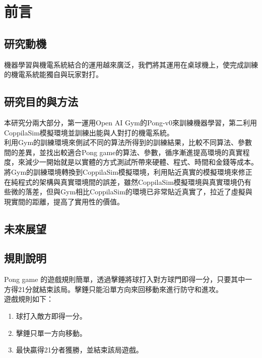 \documentclass[14pt,a4paper]{report}  %
\begin{document}
\chapter{前言}
\renewcommand{\baselinestretch}{10.0} %
\setcounter{page}{1}  %
\fontsize{14pt}{2.5pt}\sectionef
\section{研究動機}
 機器學習與機電系統結合的運用越來廣泛，我們將其運用在桌球機上，使完成訓練的機電系統能獨自與玩家對打。\\
\section{研究目的與方法}
 本研究分兩大部分，第一運用Open AI Gym的Pong-v0來訓練機器學習，第二利用CoppilaSim模擬環境並訓練出能與人對打的機電系統。\\
 利用Gym的訓練環境來側試不同的算法所得到的訓練結果，比較不同算法、參數間的差異，並找出較適合Pong game的算法、參數，循序漸進提高環境的真實程度，來減少一開始就是以實體的方式測試所帶來硬體、程式、時間和金錢等成本。\\[12pt]

 將Gym的訓練環境轉換到CoppilaSim模擬環境，利用貼近真實的模擬環境來修正在純程式的架構與真實環境間的誤差，雖然CoppilaSim模擬環境與真實環境仍有些微的落差，但與Gym相比CoppilaSim的環境已非常貼近真實了，拉近了虛擬與現實間的距離，提高了實用性的價值。\\

\section{未來展望}
\qquad 
\section{規則說明}
 Pong game 的遊戲規則簡單，透過擊錘將球打入對方球門即得一分，只要其中一方得21分就結束該局。擊錘只能沿單方向來回移動來進行防守和進攻。\\[12pt]

遊戲規則如下：
\begin{enumerate}
\item 球打入敵方即得一分。
\item 擊錘只單一方向移動。
\item 最快贏得21分者獲勝，並結束該局遊戲。
\end{enumerate}
\end{document}
